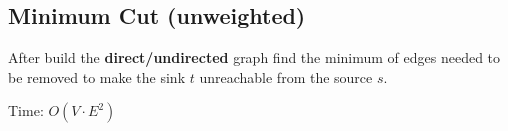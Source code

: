 \subsection{Minimum Cut (unweighted)}

After build the \textbf{direct/undirected} graph find the minimum of edges needed to be removed to make the sink $t$ unreachable from the source $s$.

Time: $O(V \cdot E^2)$
